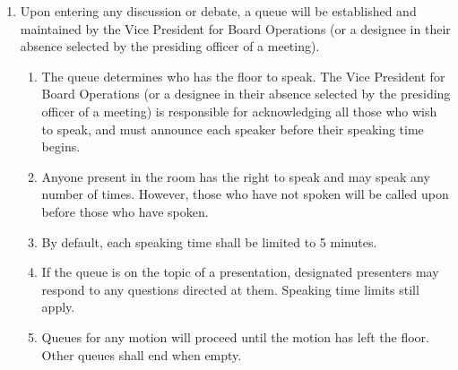 \begin{enumerate}
\begin{enumerate}
  \item The President (or presiding officer of a meeting) shall read the motion aloud and open the floor for discussion.
    \begin{enumerate}
    \item If a Representative suggests changes to the motion pertaining to its wording or language, but do not change its intent or merits, it may be amended by the author with the consent of the second.
    \item If a Representative suggests changes to the motion pertaining to its intent or merits, it may be amended by a majority vote of the Executive Board. This vote shall be conducted by a voice vote unless a show of hands or a roll call is requested by a Representative or the President.
    \item After any amendments are made, the President (or presiding officer of a meeting) shall read the amended motion aloud.
    \end{enumerate}
  \item Once all motions pertaining to the topic have concluded, parties with a conflict of interest shall be invited back into the room and the President (or presiding officer of a meeting) shall announce the outcome of all motions discussed.
  \end{enumerate}
\item Upon entering any discussion or debate, a queue will be established and maintained by the Vice President for Board Operations (or a designee in their absence selected by the presiding officer of a meeting).
  \begin{enumerate}
  \item The queue determines who has the floor to speak. The Vice President for Board Operations (or a designee in their absence selected by the presiding officer of a meeting) is responsible for acknowledging all those who wish to speak, and must announce each speaker before their speaking time begins.
  \item Anyone present in the room has the right to speak and may speak any number of times. However, those who have not spoken will be called upon before those who have spoken.
  \item By default, each speaking time shall be limited to 5 minutes.
  \item If the queue is on the topic of a presentation, designated presenters may respond to any questions directed at them. Speaking time limits still apply.
  \item Queues for any motion will proceed until the motion has left the floor. Other queues shall end when empty.

\end{enumerate}
\end{enumerate}
